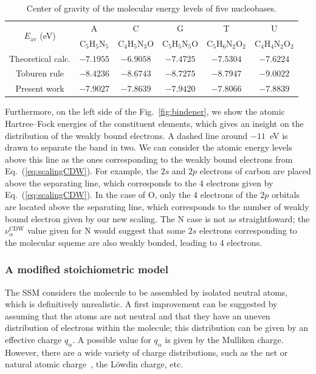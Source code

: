 \documentclass[preprint]{revtex4-2}
\begin{document}
\begin{table}[H]
\begin{center}
\begin{tabular}{|c|ccccc|}
\hline
 \multirow{2}{*}{$E_{\text{av}}$ (eV)} & A & C & G & T & U \\
 & C$_5$H$_5$N$_5$ & C$_4$H$_5$N$_3$O & 
   C$_5$H$_5$N$_5$O & C$_5$H$_6$N$_2$O$_2$ & C$_4$H$_4$N$_2$O$_2$ \\
\hline
 Theoretical calc. & $-7.1955$ & $-6.9058$ & $-7.4725$ & $-7.5304$ & $-7.6224$ \\
 Toburen rule  & $-8.4236$ & $-8.6743$ & $-8.7275$ & $-8.7947$ & $-9.0022$ \\
 Present work & $-7.9027$ & $-7.8639$ & $-7.9420$ & $-7.8066$ & $-7.8839$ \\
\hline
\end{tabular}
\caption{Center of gravity of the molecular energy levels of five 
nucleobases.}
\label{tab:gravener}
\end{center}
\end{table}


Furthermore, on the left side of the Fig.~\ref{fig:bindener}, we show 
the atomic Hartree--Fock energies of the constituent elements, which 
gives an insight on the distribution of the weakly bound electrons. 
A dashed line around $-11$~eV is drawn to separate the band in two. 
We can consider the atomic energy levels above this line as the ones
corresponding to the weakly bound electrons from Eq.~(\ref{eq:scalingCDW}).
For example, the $2s$ and $2p$ electrons of carbon are placed above
the separating line, which corresponds to the 4 electrons given by 
Eq.~(\ref{eq:scalingCDW}). In the case of O, only the 4 electrons of 
the $2p$ orbitals are located above the separating line, which 
corresponds to the number of weakly bound electron given by 
our new scaling. 
The N case is not as straightfoward; the $\nu_{\alpha }^{\text{CDW}}$ 
value given for N would suggest that some $2s$ electrons corresponding 
to the molecular squeme are also weakly bonded, leading to 4 electrons.



\subsubsection{A modified stoichiometric model}

The SSM considers the molecule to be assembled by isolated neutral atoms, 
which is definitively unrealistic. A first improvement can be suggested 
by assuming that the atoms are not neutral and that they have an uneven
distribution of electrons within the molecule; this distribution can be
given by an effective charge $q_{\alpha}$. A possible value for 
$q_{\alpha}$ is given by the Mulliken charge. However, there are a wide
variety of charge distributions, such as the net or natural atomic
charge~\cite{lee2003}, the L\"owdin charge, etc.
\end{document}
